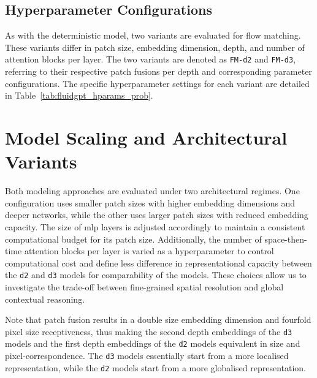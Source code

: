\subsection{Hyperparameter Configurations}

As with the deterministic model, two variants are evaluated for flow matching. These variants differ in patch size, embedding dimension, depth, and number of attention blocks per layer. The two variants are denoted as \texttt{FM-d2} and \texttt{FM-d3}, referring to their respective patch fusions per depth and corresponding parameter configurations. The specific hyperparameter settings for each variant are detailed in Table~\ref{tab:fluidgpt_hparams_prob}.



\section{Model Scaling and Architectural Variants}\label{sec:model_variants}

Both modeling approaches are evaluated under two architectural regimes. One configuration uses smaller patch sizes with higher embedding dimensions and deeper networks, while the other uses larger patch sizes with reduced embedding capacity. The size of mlp layers is adjusted accordingly to maintain a consistent computational budget for its patch size. Additionally, the number of space-then-time attention blocks per layer is varied as a hyperparameter to control computational cost and define less difference in representational capacity between the \texttt{d2} and \texttt{d3} models for comparability of the models. These choices allow us to investigate the trade-off between fine-grained spatial resolution and global contextual reasoning. 

Note that patch fusion results in a double size embedding dimension and fourfold pixel size receptiveness, thus making the second depth embeddings of the \texttt{d3} models and the first depth embeddings of the \texttt{d2} models equivalent in size and pixel-correspondence. The \texttt{d3} models essentially start from a more localised representation, while the \texttt{d2} models start from a more globalised representation. 